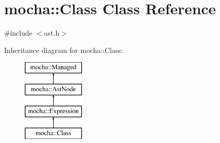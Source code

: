 \hypertarget{classmocha_1_1_class}{
\section{mocha::Class Class Reference}
\label{classmocha_1_1_class}
}


{\ttfamily \#include $<$ast.h$>$}

Inheritance diagram for mocha::Class:\begin{figure}[H]
\begin{center}
\leavevmode
\includegraphics[height=4.000000cm]{classmocha_1_1_class}
\end{center}
\end{figure}
